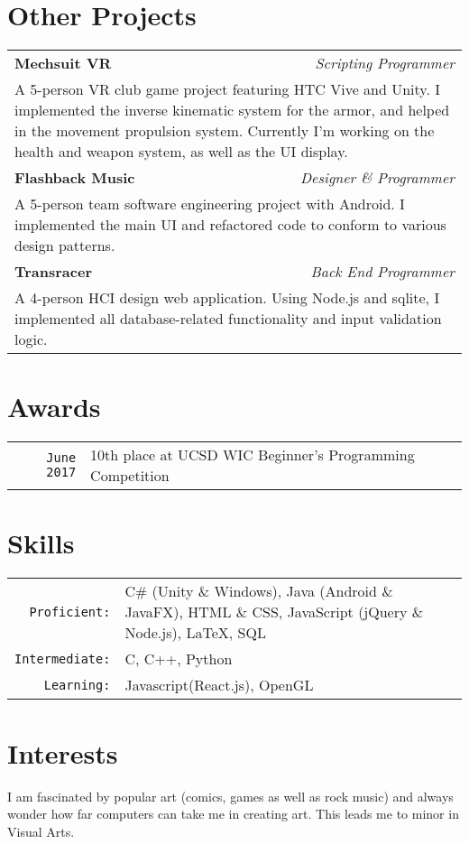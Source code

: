 \documentclass[12pt, letterpaper]{article}
\begin{document}
\section{Other Projects}
\smallskip
\noindent
\begin{tabular}{l r}	
\textbf{\large Mechsuit VR} & \textit{Scripting Programmer} \\
\multicolumn{2}{p{\linewidth}}{A 5-person VR club game project featuring HTC Vive and Unity. I implemented the inverse kinematic system for the armor, and helped in the movement propulsion system. Currently I'm working on the health and weapon system, as well as the UI display.} \\
\textbf{\large Flashback Music} & \textit{Designer \& Programmer} \\
\multicolumn{2}{p{\linewidth}}{A 5-person team software engineering project with Android. I implemented the main UI and refactored code to conform to various design patterns.} \\
\textbf{\large Transracer} & \textit{Back End Programmer} \\
\multicolumn{2}{p{\linewidth}}{A 4-person HCI design web application. Using Node.js and sqlite, I implemented all database-related functionality and input validation logic.}
\end{tabular}


\section{Awards}
\smallskip
\noindent
\begin{tabularx}{\linewidth}{r | X}
	\texttt{June 2017} & 10th place at UCSD WIC Beginner's Programming Competition
\end{tabularx}


\section{Skills}
\smallskip
\noindent
\begin{tabularx}{\linewidth}{r X}
	\texttt{Proficient:} & C\# (Unity \& Windows), Java (Android \& JavaFX), HTML \& CSS, JavaScript (jQuery \& Node.js), \LaTeX, SQL \\
	\texttt{Intermediate:} & C, C++, Python \\
	\texttt{Learning:} & Javascript(React.js), OpenGL
\end{tabularx}


\section{Interests}
\smallskip
\noindent
I am fascinated by popular art (comics, games as well as rock music) and always wonder how far computers can take me in creating art. This leads me to minor in Visual Arts.
\end{document}
